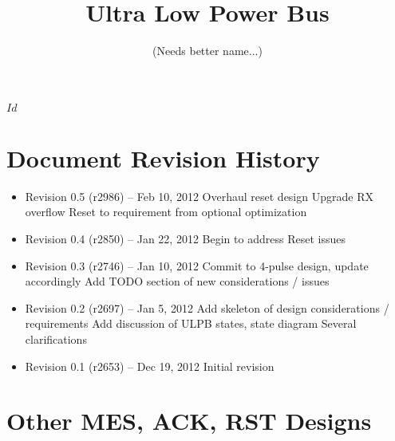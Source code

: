 \documentclass{article}
\newcommand{\bus}{ULPB\xspace}
\begin{document}
\svnInfo $Id$ 

\pagestyle{fancyplain}

\title{\vspace{-1em} Ultra Low Power Bus}
\author{(Needs better name...)}
\date{}
\maketitle

\tableofcontents
\clearpage


\clearpage


\clearpage


\clearpage


\clearpage



\clearpage
\section{Document Revision History}
\label{sec:revisions}

\begin{itemize}

\item Revision 0.5 {\footnotesize(r2986)} -- Feb 10, 2012
\subitem Overhaul reset design
\subitem Upgrade RX overflow Reset to requirement from optional optimization

\item Revision 0.4 {\footnotesize(r2850)} -- Jan 22, 2012
\subitem Begin to address Reset issues

\item Revision 0.3 {\footnotesize(r2746)} -- Jan 10, 2012
\subitem Commit to 4-pulse design, update accordingly
\subitem Add TODO section of new considerations / issues

\item Revision 0.2 {\footnotesize(r2697)} -- Jan 5, 2012
\subitem Add skeleton of design considerations / requirements
\subitem Add discussion of \bus states, state diagram
\subitem Several clarifications

\item Revision 0.1 {\footnotesize(r2653)} -- Dec 19, 2012
\subitem Initial revision

\end{itemize}

\clearpage
\appendix
\section{Other MES, ACK, RST Designs}
\label{sec:appendix-reset}

\FloatBarrier
\clearpage

\FloatBarrier
\end{document}
